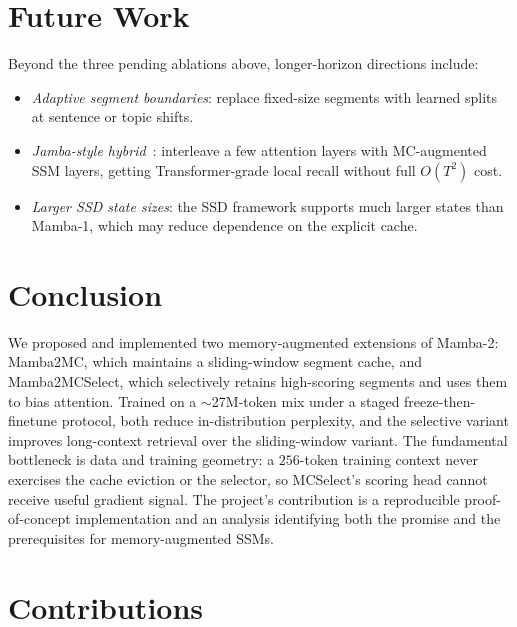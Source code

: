 \documentclass[conference]{IEEEtran}
\begin{document}
\section{Future Work}

Beyond the three pending ablations above, longer-horizon directions include:
\begin{itemize}
    \item \emph{Adaptive segment boundaries}: replace fixed-size segments with learned splits at sentence or topic shifts.
    \item \emph{Jamba-style hybrid}~\cite{lieber2024jambahybridtransformermambalanguage}: interleave a few attention layers with MC-augmented SSM layers, getting Transformer-grade local recall without full $O(T^2)$ cost.
    \item \emph{Larger SSD state sizes}: the SSD framework supports much larger states than Mamba-1, which may reduce dependence on the explicit cache.
\end{itemize}

\section{Conclusion}

We proposed and implemented two memory-augmented extensions of Mamba-2: Mamba2MC, which maintains a sliding-window segment cache, and Mamba2MCSelect, which selectively retains high-scoring segments and uses them to bias attention. Trained on a $\sim$27M-token mix under a staged freeze-then-finetune protocol, both reduce in-distribution perplexity, and the selective variant improves long-context retrieval over the sliding-window variant. The fundamental bottleneck is data and training geometry: a $256$-token training context never exercises the cache eviction or the selector, so MCSelect's scoring head cannot receive useful gradient signal. The project's contribution is a reproducible proof-of-concept implementation and an analysis identifying both the promise and the prerequisites for memory-augmented SSMs.

\section{Contributions}
\end{document}
